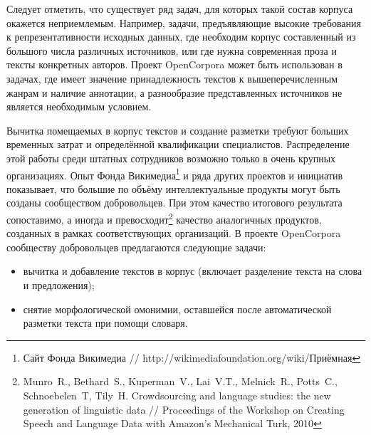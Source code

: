 \documentclass[a4paper]{article}
\begin{document}
Следует отметить, что существует ряд задач, для которых такой состав корпуса окажется неприемлемым. Например, задачи, предъявляющие высокие требования к репрезентативности исходных данных, где необходим корпус составленный из большого числа различных источников, или где нужна современная проза и тексты конкретных авторов. Проект OpenCorpora может быть использован в задачах, где имеет значение принадлежность текстов к вышеперечисленным жанрам и наличие аннотации, а разнообразие представленных источников не является необходимым условием.

Вычитка помещаемых в корпус текстов и создание разметки требуют больших временных затрат и определённой квалификации специалистов. Распределение этой работы среди штатных сотрудников возможно только в очень крупных организациях. Опыт Фонда Викимедиа\footnote{Сайт Фонда Викимедиа // http://wikimediafoundation.org/wiki/Приёмная} и ряда других проектов и инициатив показывает, что большие по объёму интеллектуальные продукты могут быть созданы сообществом добровольцев. При этом качество итогового результата сопоставимо, а иногда и превосходит\footnote{Munro~R., Bethard~S., Kuperman~V., Lai~V.T., Melnick~R., Potts~C., Schnoebelen~T, Tily~H. Crowdsourcing and language studies: the new generation of linguistic data // Proceedings of the Workshop on Creating Speech and Language Data with Amazon's Mechanical Turk, 2010} качество аналогичных продуктов, созданных в рамках соответствующих организаций. В проекте OpenCorpora сообществу добровольцев предлагаются следующие задачи:
\begin{itemize}
\item вычитка и добавление текстов в корпус (включает разделение текста на слова и предложения);
\item снятие морфологической омонимии, оставшейся после автоматической разметки текста при помощи словаря.
\end{itemize}
\end{document}
